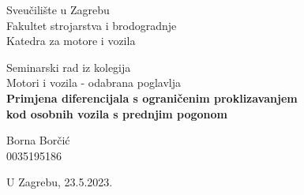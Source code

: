 \begin{titlepage}
	\begin{center}
		\vspace*{1cm}
		
		\large
		Sveučilište u Zagrebu\\
		\vspace*{0.5cm}
		Fakultet strojarstva i brodogradnje\\
		\normalsize
		Katedra za motore i vozila
		
		\vspace{5.5cm}
		Seminarski rad iz kolegija\\
		Motori i vozila - odabrana poglavlja\\
		\vspace{1cm}
		\LARGE
		\textbf{Primjena diferencijala s ograničenim proklizavanjem}\\
		\textbf{kod osobnih vozila s prednjim pogonom}
	\end{center}
	
	\begin{flushright}
	
		\vspace{8.5cm}
		\normalsize
		Borna Borčić\\
		0035195186
	\end{flushright}
	\begin{center}
	
		\vfill
		\normalsize
		U Zagrebu, 23.5.2023.\\
	\end{center}
\end{titlepage}